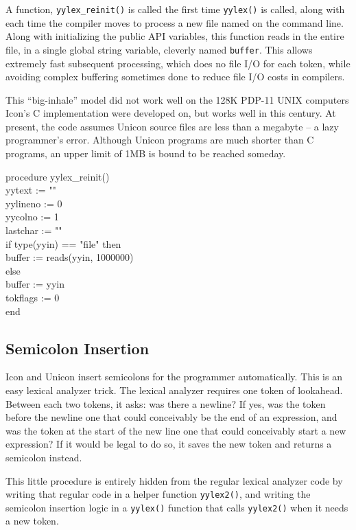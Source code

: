 A function, \texttt{yylex\_reinit()} is called the first time
\texttt{yylex()} is called, along with each time the compiler moves to
process a new file named on the command line. Along with initializing
the public API variables, this function reads in the entire file, in a
single global string variable, cleverly named \texttt{buffer}. This
allows extremely fast subsequent processing, which does no file I/O
for each token, while avoiding complex buffering sometimes done to
reduce file I/O costs in compilers.

This ``big-inhale'' model did not work well on the 128K PDP-11 UNIX
computers Icon's C implementation were developed on, but works well in
this century. At present, the code assumes Unicon source files are
less than a megabyte -- a lazy programmer's error. Although Unicon
programs are much shorter than C programs, an upper limit of 1MB is
bound to be reached someday.

\begin{iconcode}
procedure yylex\_reinit() \\
\>   yytext := "" \\
\>   yylineno := 0 \\
\>   yycolno := 1 \\
\>   lastchar := "" \\
\>   if type(yyin) == "file" then \\
\> \>     buffer := reads(yyin, 1000000) \\
\>   else \\
\> \>     buffer := yyin \\
\>   tokflags := 0 \\
end
\end{iconcode}


\subsection{Semicolon Insertion}

Icon and Unicon insert semicolons for the programmer
automatically. This is an easy lexical analyzer trick. The lexical
analyzer requires one token of lookahead. Between each two tokens, it
asks: was there a newline?  If yes, was the token before the newline
one that could conceivably be the end of an expression, and was the
token at the start of the new line one that could conceivably start a
new expression? If it would be legal to do so, it saves the new token
and returns a semicolon instead.

This little procedure is entirely hidden from the regular lexical
analyzer code by writing that regular code in a helper function
\texttt{yylex2()}, and writing the semicolon insertion logic in a
\texttt{yylex()} function that calls \texttt{yylex2()} when it needs a
new token.

